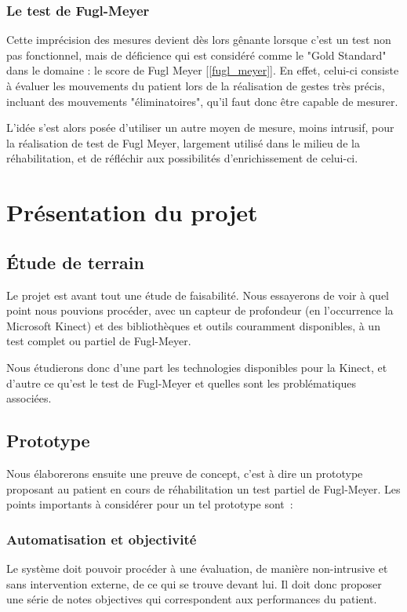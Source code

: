     \subsubsection{Le test de Fugl-Meyer}
Cette imprécision des mesures devient dès lors gênante lorsque c'est un test non pas fonctionnel, mais de déficience qui est considéré comme le "Gold Standard" dans le domaine : le score de Fugl Meyer [\ref{fugl_meyer}]. En effet, celui-ci consiste à évaluer les mouvements du patient lors de la réalisation de gestes très précis, incluant des mouvements "éliminatoires", qu'il faut donc être capable de mesurer.  
  
  L'idée s'est alors posée d'utiliser un autre moyen de mesure, moins intrusif, pour la réalisation de test de Fugl Meyer, largement utilisé dans le milieu de la réhabilitation, et de réfléchir aux possibilités d'enrichissement de celui-ci.
\newpage
    \section{Présentation du projet}
    
      \subsection{Étude de terrain} \label{etude_terrain}
    Le projet est avant tout une étude de faisabilité. Nous essayerons de voir
    à quel point nous pouvions procéder, avec un capteur de profondeur (en
    l'occurrence la Microsoft Kinect) et des bibliothèques et outils couramment 
    disponibles, à un test complet ou partiel de Fugl-Meyer.
    
    Nous étudierons donc d'une part les technologies disponibles pour la Kinect,
    et d'autre ce qu'est le test de Fugl-Meyer et quelles sont les 
    problématiques associées.
    
    \subsection{Prototype}
    Nous élaborerons ensuite une preuve de concept, c'est à dire un 
    prototype proposant au patient en cours de réhabilitation un test partiel 
    de Fugl-Meyer. Les points importants à considérer pour un tel prototype 
    sont~:
    \subsubsection{Automatisation et objectivité}
    Le système doit pouvoir procéder à une évaluation, de manière non-intrusive 
    et sans intervention externe, de ce qui se trouve devant lui. Il doit donc 
    proposer une série de notes objectives qui correspondent aux performances du 
    patient.
